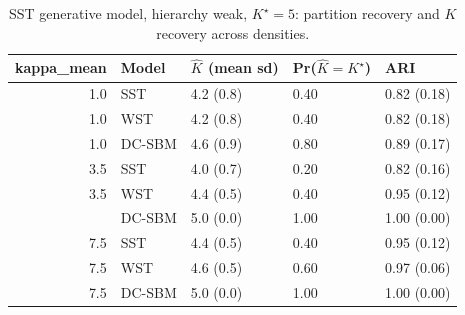 \begin{table}
\centering
\caption{SST generative model, hierarchy weak, $K^\star=5$: partition recovery and $K$ recovery across densities.}
\centering
\begin{tabular}[t]{rllll}
\toprule
kappa_mean & Model & $\hat K$ (mean sd) & Pr($\hat K = K^\star$) & ARI\\
\midrule
1.0 & SST & 4.2 (0.8) & 0.40 & 0.82 (0.18)\\
1.0 & WST & 4.2 (0.8) & 0.40 & 0.82 (0.18)\\
1.0 & DC-SBM & 4.6 (0.9) & 0.80 & 0.89 (0.17)\\
3.5 & SST & 4.0 (0.7) & 0.20 & 0.82 (0.16)\\
3.5 & WST & 4.4 (0.5) & 0.40 & 0.95 (0.12)\\
\addlinespace
3.5 & DC-SBM & 5.0 (0.0) & 1.00 & 1.00 (0.00)\\
7.5 & SST & 4.4 (0.5) & 0.40 & 0.95 (0.12)\\
7.5 & WST & 4.6 (0.5) & 0.60 & 0.97 (0.06)\\
7.5 & DC-SBM & 5.0 (0.0) & 1.00 & 1.00 (0.00)\\
\bottomrule
\end{tabular}
\end{table}
